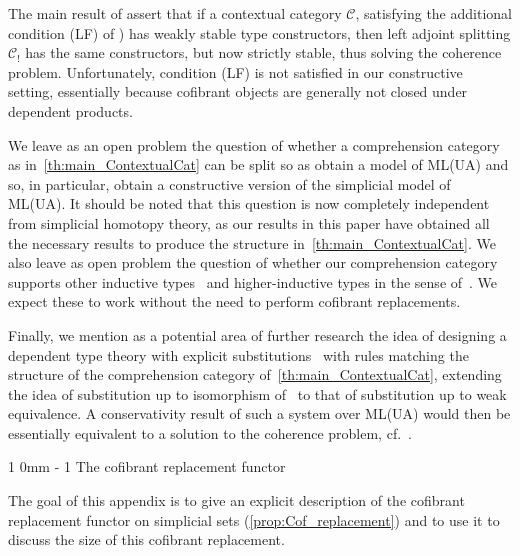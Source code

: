 \documentclass[reqno,10pt,a4paper,oneside,draft]{amsart}
\makeatletter
\renewcommand{\section}{\@startsection
{section}%
{1}%
{0mm}%
{-\baselineskip}%
{1\baselineskip}%
{\Large \bfseries}}%
\numberwithin{equation}{section}
\theoremstyle{mythm}
\theoremstyle{mydef}
\theoremstyle{myrmk}
\makeatother
\begin{document}
\begin{remark}
The main result of \cite{LumsdaineP:locuoc} assert that if a contextual category $\mathcal{C}$, satisfying 
the additional condition  (LF) of \cite[Definition 3.1.3]{LumsdaineP:locuoc}) has weakly stable type constructors, then left adjoint splitting $\mathcal{C}_!$ has the same constructors, but now strictly stable,
thus solving the coherence problem. Unfortunately, condition (LF) is not satisfied in our constructive
setting, essentially because cofibrant objects are generally not closed under dependent products.  
\end{remark}

We leave as an open problem the question of whether a comprehension category as in~\cref{th:main_ContextualCat} can be split so as obtain a model of ML(UA) and so, in particular,
obtain a constructive version of the simplicial model of ML(UA). It should be noted that this question
is now completely independent from simplicial homotopy theory, as our results in this paper have 
obtained all the necessary results to produce the structure in~\cref{th:main_ContextualCat}. 
We also leave as open problem the question of whether our comprehension category supports
other inductive types~\cite{vandenberg_moerdijk_2015} and higher-inductive types in the sense of~\cite{hottbook}. 
We expect these to work without the need to perform cofibrant replacements. 


Finally, we mention as a potential area of further research the idea of designing a dependent type
theory with explicit substitutions~\cite{AbadiM:exps} with rules matching the structure of the comprehension category of~\cref{th:main_ContextualCat}, extending the idea of 
substitution up to isomorphism of~\cite{CurienP:subi} to that of substitution up to weak equivalence. 
A conservativity result of such a system over ML(UA)
would then be essentially equivalent to a solution to the coherence problem, {cf.}~\cite{CurienPL:revcit}.


\appendix

\section{The cofibrant replacement functor}
\label{sec:appendix}


The goal of this appendix is to give an explicit description of the cofibrant replacement functor on simplicial sets (\cref{prop:Cof_replacement}) and to use it to discuss the size of this cofibrant replacement.
\end{document}
